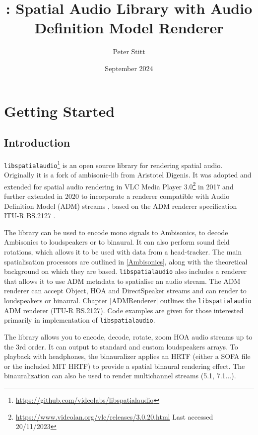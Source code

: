 \documentclass[12pt]{report}
\title{\libspataud: Spatial Audio Library with Audio Definition Model Renderer}
\author{Peter Stitt}
\date{September 2024}
\def\libspataud{\texttt{libspatialaudio}\xspace}
\begin{document}
\maketitle

\tableofcontents

\chapter{Getting Started}\label{GettingStarted}

\section{Introduction}
\libspataud\footnote{\href{https://github.com/videolabs/libspatialaudio}{https://github.com/videolabs/libspatialaudio}} is an open source library for rendering spatial audio.
Originally it is a fork of ambisonic-lib from Aristotel Digenis.
It was adopted and extended for spatial audio rendering in VLC Media Player 3.0\footnote{\href{https://www.videolan.org/vlc/releases/3.0.20.html}{https://www.videolan.org/vlc/releases/3.0.20.html} Last accessed 20/11/2023} in 2017 and further extended in 2020 to incorporate a renderer compatible with Audio Definition Model (ADM) streams \cite{ITU2076}, based on the ADM renderer specification ITU-R BS.2127 \cite{ITU2127}.

The library can be used to encode mono signals to Ambisonics, to decode Ambisonics to loudspeakers or to binaural.
It can also perform sound field rotations, which allows it to be used with data from a head-tracker.
The main spatialisation processors are outlined in \cref{Ambisonics}, along with the theoretical background on which they are based.
\libspataud also includes a renderer that allows it to use ADM metadata to spatialise an audio stream.
The ADM renderer can accept Object, HOA and DirectSpeaker streams and can render to loudspeakers or binaural.
Chapter \ref{ADMRenderer} outlines the \libspataud ADM renderer (ITU-R BS.2127).
Code examples are given for those interested primarily in implementation of \libspataud.

The library allows you to encode, decode, rotate, zoom HOA audio streams up to the 3rd order. It can output to standard and custom loudspeakers arrays. To playback with headphones, the binauralizer applies an HRTF (either a SOFA file or  the included MIT HRTF) to provide a spatial binaural rendering effect. The binauralization can also be used to render multichannel streams (5.1, 7.1...).
\end{document}
